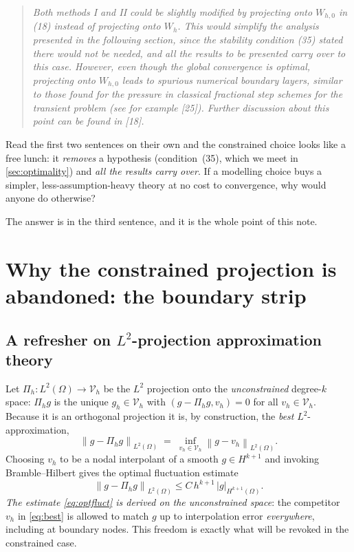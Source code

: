 \documentclass[11pt]{article}
\newcommand{\norm}[1]{\left\lVert #1 \right\rVert}
\newcommand{\Vh}{\mathcal{V}_{h}}
\theoremstyle{plain}
\theoremstyle{definition}
\theoremstyle{remark}
\begin{document}
\begin{quote}\itshape
Both methods I and II could be slightly modified by projecting onto
$W_{h,0}$ in (18) instead of projecting onto $W_h$. This would simplify
the analysis presented in the following section, since the stability
condition (35) stated there would not be needed, and all the results to
be presented carry over to this case. However, even though the global
convergence is optimal, projecting onto $W_{h,0}$ leads to spurious
numerical boundary layers, similar to those found for the pressure in
classical fractional step schemes for the transient problem (see for
example [25]). Further discussion about this point can be found in [18].
\end{quote}

Read the first two sentences on their own and the constrained choice
looks like a free lunch: it \emph{removes} a hypothesis (condition~(35),
which we meet in \cref{sec:optimality}) and \emph{all the results carry
over}. If a modelling choice buys a simpler, less-assumption-heavy
theory at no cost to convergence, why would anyone do otherwise?

The answer is in the third sentence, and it is the whole point of this
note.

\section{Why the constrained projection is abandoned: the boundary strip}
\label{sec:strip}

\subsection{A refresher on \texorpdfstring{$L^2$}{L2}-projection approximation theory}

Let $\Pi_h:L^2(\Omega)\to\Vh$ be the $L^2$ projection onto the
\emph{unconstrained} degree-$k$ space: $\Pi_h g$ is the unique
$g_h\in\Vh$ with $(g-\Pi_h g,v_h)=0$ for all $v_h\in\Vh$. Because it is
an orthogonal projection it is, by construction, the \emph{best}
$L^2$-approximation,
%
\begin{equation}\label{eq:best}
  \norm{g-\Pi_h g}_{L^2(\Omega)}
  \;=\;\inf_{v_h\in\Vh}\norm{g-v_h}_{L^2(\Omega)}.
\end{equation}
%
Choosing $v_h$ to be a nodal interpolant of a smooth $g\in H^{k+1}$ and
invoking Bramble--Hilbert gives the optimal fluctuation estimate
%
\begin{equation}\label{eq:optfluct}
  \norm{g-\Pi_h g}_{L^2(\Omega)}\le C\,h^{k+1}\,\lvert g\rvert_{H^{k+1}(\Omega)}.
\end{equation}
%
\emph{The estimate \cref{eq:optfluct} is derived on the unconstrained
space}: the competitor $v_h$ in \cref{eq:best} is allowed to match $g$
up to interpolation error \emph{everywhere}, including at boundary
nodes. This freedom is exactly what will be revoked in the constrained
case.
\end{document}
